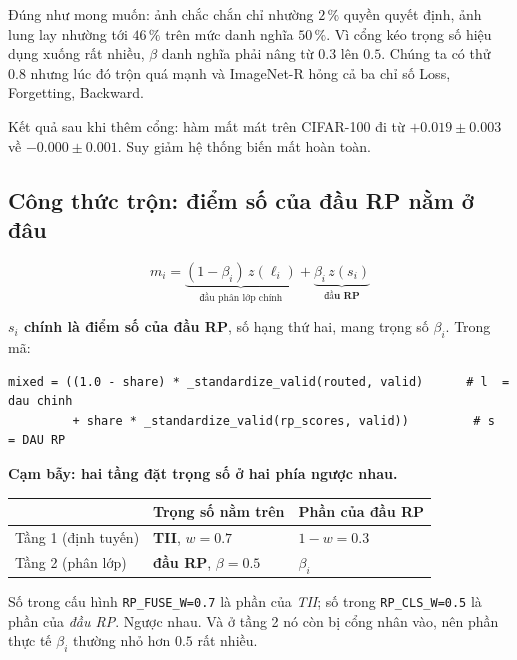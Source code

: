 \documentclass[11pt,a4paper]{article}
\newenvironment{luuy}{\begin{leftbar}\noindent\ignorespaces}{\end{leftbar}}
\begin{document}
Đúng như mong muốn: ảnh chắc chắn chỉ nhường $2\,\%$ quyền quyết định, ảnh lung
lay nhường tới $46\,\%$ trên mức danh nghĩa $50\,\%$. Vì cổng kéo trọng số hiệu
dụng xuống rất nhiều, $\beta$ danh nghĩa phải nâng từ $0.3$ lên $\mathbf{0.5}$.
Chúng ta có thử $0.8$ nhưng lúc đó trộn quá mạnh và ImageNet-R hỏng cả ba chỉ số
Loss, Forgetting, Backward.

Kết quả sau khi thêm cổng: hàm mất mát trên CIFAR-100 đi từ
$\mathbf{+0.019 \pm 0.003}$ về $\mathbf{-0.000 \pm 0.001}$. Suy giảm hệ thống
biến mất hoàn toàn.

\subsection{Công thức trộn: điểm số của đầu RP nằm ở đâu}
\label{sec:cong-thuc-tron}

\begin{equation}
m_i = \underbrace{(1 - \beta_i)\, z(\ell_i)}_{\text{đầu phân lớp chính}}
    + \underbrace{\beta_i\, z(s_i)}_{\textbf{đầu RP}}
\label{eq:mix}
\end{equation}

\textbf{$s_i$ chính là điểm số của đầu RP}, số hạng thứ hai, mang trọng số
$\beta_i$. Trong mã:

\begin{footnotesize}
\begin{verbatim}
mixed = ((1.0 - share) * _standardize_valid(routed, valid)      # l  = dau chinh
         + share * _standardize_valid(rp_scores, valid))         # s  = DAU RP
\end{verbatim}
\end{footnotesize}

\begin{luuy}
\textbf{Cạm bẫy: hai tầng đặt trọng số ở hai phía ngược nhau.}

\smallskip
\begin{tabular}{@{}lll@{}}
\toprule
 & Trọng số nằm trên & Phần của đầu RP \\
\midrule
Tầng 1 (định tuyến) & \textbf{TII}, $w = 0.7$ & $1 - w = 0.3$ \\
Tầng 2 (phân lớp)   & \textbf{đầu RP}, $\beta = 0.5$ & $\beta_i$ \\
\bottomrule
\end{tabular}
\smallskip

Số trong cấu hình \texttt{RP\_FUSE\_W=0.7} là phần của \emph{TII}; số trong
\texttt{RP\_CLS\_W=0.5} là phần của \emph{đầu RP}. Ngược nhau. Và ở tầng 2 nó còn
bị cổng nhân vào, nên phần thực tế $\beta_i$ thường nhỏ hơn $0.5$ rất nhiều.
\end{luuy}
\end{document}
